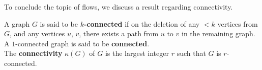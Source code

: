 			To conclude the topic of flows, we discuss a result regarding connectivity.

			\begin{ftheo}
				A graph $G$ is said to be \textbf{$k$-connected} if on the deletion of any $<k$ vertices from $G$, and any vertices $u$, $v$, there exists a path from $u$ to $v$ in the remaining graph.
				A $1$-connected graph is said to be \textbf{connected}. \\
				The \textbf{connectivity} $\kappa(G)$ of $G$ is the largest integer $r$ such that $G$ is $r$-connected.
			\end{ftheo}